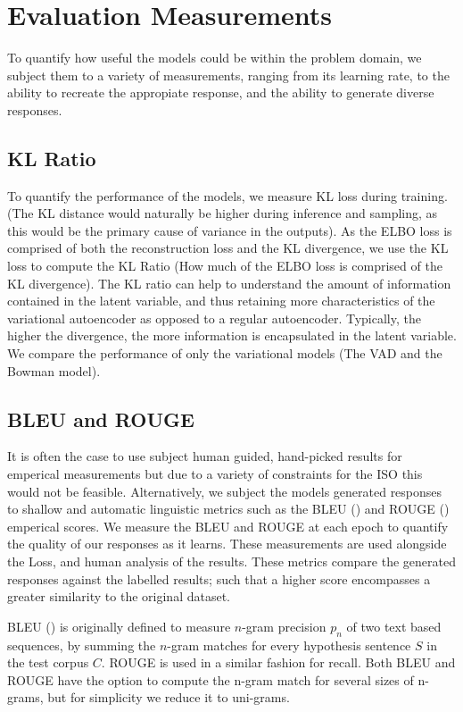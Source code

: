 \documentclass[12pt,twoside]{report}
\begin{document}
\section{Evaluation Measurements}

To quantify how useful the models could be within the problem domain, we subject them to a variety of measurements, ranging from its learning rate, to the ability to recreate the appropiate response, and the ability to generate diverse responses.

\subsection{KL Ratio}

To quantify the performance of the models, we measure KL loss during training. (The KL distance would naturally be higher during inference and sampling, as this would be the primary cause of variance in the outputs). As the ELBO loss is comprised of both the reconstruction loss and the KL divergence, we use the KL loss to compute the KL Ratio (How much of the ELBO loss is comprised of the KL divergence). The KL ratio can help to understand the amount of information contained in the latent variable, and thus retaining more characteristics of the variational autoencoder as opposed to a regular autoencoder.  Typically, the higher the divergence, the more information is encapsulated in the latent variable. We compare the performance of only the variational models (The VAD and the Bowman model).

\subsection{BLEU and ROUGE}

It is often the case to use subject human guided, hand-picked results for emperical measurements but due to a variety of constraints for the ISO this would not be feasible. Alternatively, we subject the models generated responses to shallow and automatic linguistic metrics such as the BLEU (\cite{papineni_bleu:_2001}) and ROUGE (\cite{lin_rouge:_2004}) emperical scores. We measure the BLEU and ROUGE at each epoch to quantify the quality of our responses as it learns. These measurements are used alongside the Loss, and human analysis of the results. These metrics compare the generated responses against the labelled results; such that a higher score encompasses a greater similarity to the original dataset.

BLEU (\cite{papineni_bleu:_2001}) is originally defined to measure $n$-gram precision $p_n$ of two text based sequences, by summing the $n$-gram matches for every hypothesis sentence $S$ in the test corpus $C$. ROUGE is used in a similar fashion for recall. Both BLEU and ROUGE have the option to compute the n-gram match for several sizes of n-grams, but for simplicity we reduce it to uni-grams.
\end{document}
